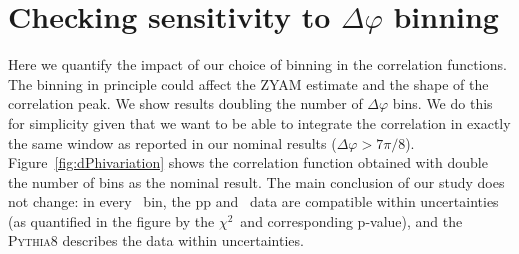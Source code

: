 \section{Checking sensitivity to $\Delta\varphi$ binning }

Here we quantify the impact of our choice of binning in the correlation functions. The binning in principle could affect the ZYAM estimate and the shape of the correlation peak. We show results doubling the number of $\Delta\varphi$ bins. We do this for simplicity given that we want to be able to integrate the correlation in exactly the same window as reported in our nominal results ($\Delta\varphi>7\pi/8$). Figure~\ref{fig:dPhivariation} shows the correlation function obtained with double the number of bins as the nominal result. The main conclusion of our study does not change: in every \zt~bin, the pp and \pPb~data are compatible within uncertainties (as quantified in the figure by the $\chi^{2}$~and corresponding p-value), and the \textsc{Pythia8} describes the data within uncertainties. 

